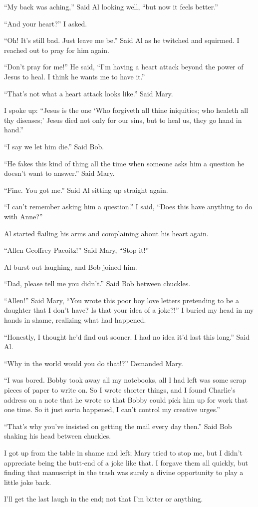 ``My back was aching,'' Said Al looking well, ``but now it feels better.''

``And your heart?'' I asked.

``Oh! It's still bad. Just leave me be.'' Said Al as he twitched and squirmed. I reached out to pray for him again.

``Don't pray for me!'' He said, ``I'm having a heart attack beyond the power of Jesus to heal. I think he wants me to have it.''

``That's not what a heart attack looks like.'' Said Mary.

I spoke up: ``Jesus is the one `Who forgiveth all thine iniquities; who healeth all thy diseases;' Jesus died not only for our sins, but to heal us, they go hand in hand.''

``I say we let him die.'' Said Bob.

``He fakes this kind of thing all the time when someone asks him a question he doesn't want to answer.'' Said Mary.

``Fine. You got me.'' Said Al sitting up straight again.

``I can't remember asking him a question.'' I said, ``Does this have anything to do with Anne?''

Al started flailing his arms and complaining about his heart again.

``Allen Geoffrey Pa\-co\-itz!'' Said Mary, ``Stop it!''

Al burst out laughing, and Bob joined him.

``Dad, please tell me you didn't.'' Said Bob between chuckles.

``Allen!'' Said Mary, ``You wrote this poor boy love letters pretending to be a daughter that I don't have? Is that your idea of a joke?!''
 I buried my head in my hands in shame, realizing what had happened.

``Honestly, I thought he'd find out sooner. I had no idea it'd last this long.'' Said Al.

``Why in the world would you do that!?'' Demanded Mary.

``I was bored. Bobby took away all my notebooks, all I had left was some scrap pieces of paper to write on. So I wrote shorter things, and I found Charlie's address on a note that he wrote so that Bobby could pick him up for work that one time. So it just sorta happened, I can't control my creative urges.''

``That's why you've insisted on getting the mail every day then.'' Said Bob shaking his head between chuckles.

I got up from the table in shame and left; Mary tried to stop me, but I didn't appreciate being the butt-end of a joke like that. I forgave them all quickly, but finding that manuscript in the trash was surely a divine opportunity to play a little joke back.

I'll get the last laugh in the end; not that I'm bitter or anything.
